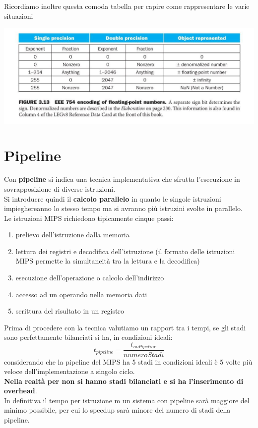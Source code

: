 \documentclass[a4paper,12pt, oneside]{book}
\begin{document}
Ricordiamo inoltre questa comoda tabella per capire come rappresentare le varie situazioni
\begin{center}
  \includegraphics[scale = 0.7]{img/tab.jpg}
\end{center} 
\section{Pipeline}
Con \textbf{pipeline} si indica una tecnica implementativa che sfrutta l'esecuzione
in sovrapposizione di diverse istruzioni.\\
Si introducre quindi il \textbf{calcolo parallelo} in quanto le singole istruzioni impieghereanno lo stesso tempo ma si avranno più istruzini svolte in parallelo.\\
Le istruzioni MIPS richiedono tipicamente cinque passi:
\begin{enumerate}
  \item prelievo dell'istruzione dalla memoria
  \item lettura dei registri e decodifica dell'istruzione (il formato delle istruzioni MIPS permette la simultaneità tra la lettura e la decodifica)
  \item esecuzione dell'operazione o calcolo dell'indirizzo
  \item accesso ad un operando nella memoria dati
  \item scrittura del risultato in un registro  
\end{enumerate}
Prima di procedere con la tecnica valutiamo un rapport tra i tempi, se gli stadi
sono perfettamente bilanciati si ha, in condizioni ideali:
\[t_{pipeline}=\frac{t_{noPipeline}}{numeroStadi}\]
considerando che la pipeline del MIPS ha 5 stadi in condizioni ideali è 5 volte più veloce dell'implementazione a singolo ciclo.\\
\textbf{Nella realtà per non si hanno stadi bilanciati e si ha l'inserimento di overhead}.\\
In definitiva il tempo per istruzione m un sistema con pipeline sarà maggiore del minimo possibile, per cui lo speedup sarà minore del numero di stadi della pipeline.\\
\end{document}
